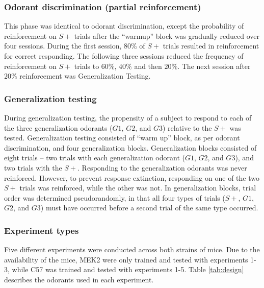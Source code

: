 \subsubsection*{Odorant discrimination (partial reinforcement)}
\label{sec:methods_discrimination}
This phase was identical to odorant discrimination, except the probability of reinforcement on $S+$ trials after the ``warmup'' block was gradually reduced over four sessions. During the first session, $80\%$ of $S+$ trials resulted in reinforcement for correct responding. The following three sessions reduced the frequency of reinforcement on $S+$ trials to $60\%$, $40\%$ and then $20\%$. The next session after $20\%$ reinforcement was Generalization Testing.

\subsubsection*{Generalization testing}
\label{sec:methods_training}
During generalization testing, the propensity of a subject to respond to each of the three generalization odorants ($G1$, $G2$, and $G3$) relative to the $S+$ was tested. Generalization testing consisted of ``warm up'' block, as per odorant discrimination, and four generalization blocks. Generalization blocks consisted of eight trials – two trials with each generalization odorant ($G1$, $G2$, and $G3$), and two trials with the $S+$. Responding to the generalization odorants was never reinforced. However, to prevent response extinction, responding on one of the two $S+$ trials was reinforced, while the other was not. In generalization blocks, trial order was determined pseudorandomly, in that all four types of trials ($S+$, $G1$, $G2$, and $G3$) must have occurred before a second trial of the same type occurred.

\subsubsection*{Experiment types}
\label{sec:methods_experiment_types}
Five different experiments were conducted across both strains of mice. Due to the availability of the mice, MEK2 were only trained and tested with experiments 1-3, while C57 was trained and tested with experiments 1-5.  Table \ref{tab:design} describes the odorants used in each experiment.


